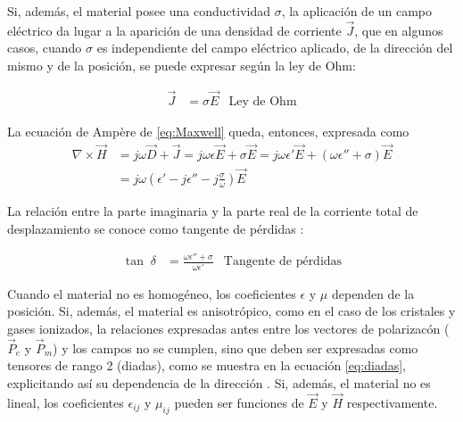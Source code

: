 Si, además, el material posee una conductividad $\sigma$, la aplicación de un campo eléctrico da lugar a la aparición de una densidad de corriente $\vec{J}$, que en algunos casos, cuando $\sigma$ es independiente del campo eléctrico aplicado, de la dirección del mismo y de la posición, se puede expresar según la ley de Ohm:

\begin{align}
	\label{eq:ohms_law}
	\vec{J} &= \sigma \vec{E} & \text{Ley de Ohm}
\end{align}

La ecuación de Ampère de \ref{eq:Maxwell} queda, entonces, expresada como
\begin{subequations}
	\begin{align}
		\nabla \times \vec{H} & = j \omega \vec{D} + \vec{J} = j \omega \epsilon \vec{E} + \sigma \vec{E} = j \omega \epsilon' \vec{E} + (\omega \epsilon'' + \sigma)\vec{E}\\
		& = j \omega \left( \epsilon' - j\epsilon'' - j \frac{\sigma}{\omega} \right) \vec{E}
	\end{align}
\end{subequations}

La relación entre la parte imaginaria y la parte real de la corriente total de desplazamiento se conoce como tangente de pérdidas \cite{Pozar:MwEngineering}:

\begin{align}
	\tan \; \delta &= \frac{\omega \epsilon'' + \sigma}{\omega \epsilon'} & \text{Tangente de pérdidas}
\end{align}

Cuando el material no es homogéneo, los coeficientes $\epsilon$ y $\mu$ dependen de la posición. Si, además, el material es anisotrópico, como en el caso de los cristales y gases ionizados, la relaciones expresadas antes entre los vectores de polarizacón ($\vec{P}_e$ y $\vec{P}_m$) y los campos no se cumplen, sino que deben ser expresadas como tensores de rango 2 (diadas), como se muestra en la ecuación \ref{eq:diadas}, explicitando así su dependencia de la dirección \cite{Collin:GuidedWaves}. Si, además, el material no es lineal, los coeficientes $\epsilon_{ij}$ y $\mu_{ij}$ pueden ser funciones de $\vec{E}$ y $\vec{H}$ respectivamente.

